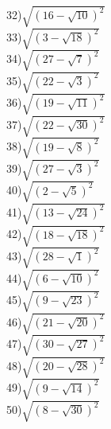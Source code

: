 \documentclass[12pt,a4paper]{article}
\begin{document}
32)$\sqrt{(16-\sqrt{10})^2}$\\
33)$\sqrt{(3-\sqrt{18})^2}$\\
34)$\sqrt{(27-\sqrt{7})^2}$\\
35)$\sqrt{(22-\sqrt{3})^2}$\\
36)$\sqrt{(19-\sqrt{11})^2}$\\
37)$\sqrt{(22-\sqrt{30})^2}$\\
38)$\sqrt{(19-\sqrt{8})^2}$\\
39)$\sqrt{(27-\sqrt{3})^2}$\\
40)$\sqrt{(2-\sqrt{5})^2}$\\
41)$\sqrt{(13-\sqrt{24})^2}$\\
42)$\sqrt{(18-\sqrt{18})^2}$\\
43)$\sqrt{(28-\sqrt{1})^2}$\\
44)$\sqrt{(6-\sqrt{10})^2}$\\
45)$\sqrt{(9-\sqrt{23})^2}$\\
46)$\sqrt{(21-\sqrt{20})^2}$\\
47)$\sqrt{(30-\sqrt{27})^2}$\\
48)$\sqrt{(20-\sqrt{28})^2}$\\
49)$\sqrt{(9-\sqrt{14})^2}$\\
50)$\sqrt{(8-\sqrt{30})^2}$\\
\end{document}

